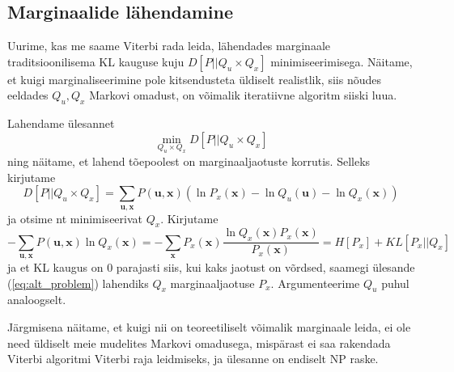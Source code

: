 \subsection{Marginaalide lähendamine}

Uurime, kas me saame Viterbi rada leida, lähendades marginaale traditsioonilisema KL kauguse kuju $D[P || Q_u \times Q_x]$ minimiseerimisega. Näitame, et kuigi marginaliseerimine pole kitsendusteta üldiselt realistlik, siis nõudes eeldades $Q_u, Q_x$ Markovi omadust, on võimalik iteratiivne algoritm siiski luua.

Lahendame ülesannet
\begin{equation}
    \label{eq:alt_problem}
    \min_{Q_u \times Q_x} D[P || Q_u \times Q_x]
\end{equation}
ning näitame, et lahend tõepoolest on marginaaljaotuste korrutis. Selleks kirjutame
$$ D[P || Q_u \times Q_x] = \sum_{\bm{u}, \bm{x}} P(\bm{u},\bm{x}) \left( \ln P_x(\bm{x}) - \ln Q_u(\bm{u}) - \ln Q_x(\bm{x}) \right) $$
ja otsime nt minimiseerivat $Q_x$. Kirjutame
$$
-\sum_{\bm{u}, \bm{x}} P(\bm{u},\bm{x}) \ln Q_x(\bm{x}) = -\sum_{\bm{x}} P_x(\bm{x}) \frac{\ln Q_x(\bm{x}) P_x(\bm{x})}{P_x(\bm{x})} = H[P_x] + KL[P_x||Q_x]
$$
ja et KL kaugus on $0$ parajasti siis, kui kaks jaotust on võrdsed, saamegi ülesande (\ref{eq:alt_problem}) lahendiks $Q_x$ marginaaljaotuse $P_x$. Argumenteerime $Q_u$ puhul analoogselt. 

Järgmisena näitame, et kuigi nii on teoreetiliselt võimalik marginaale leida, ei ole need üldiselt meie mudelites Markovi omadusega, mispärast ei saa rakendada Viterbi algoritmi Viterbi raja leidmiseks, ja ülesanne on endiselt NP raske. \bla



